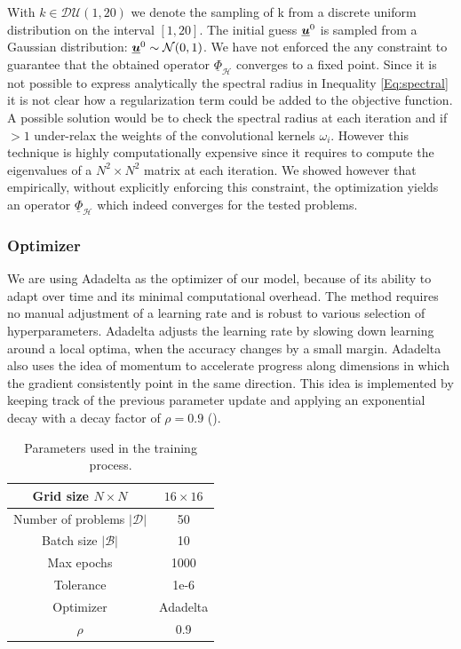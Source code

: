 \documentclass{rescience} %
\begin{document}
With $k \in \mathcal{DU}(1, 20)$ we denote the sampling of k from a discrete uniform distribution on the interval $[1, 20]$. The initial guess $\underline{{\bm{u}}}^0$ is sampled from a Gaussian distribution: $\underline{{\bm{u}}}^0 \sim \mathcal{N}(0, 1)$. We have not enforced the any constraint to guarantee that the obtained operator $\underline{\Phi}_{\mathcal{H}}$ converges to a fixed point. Since it is not possible to express analytically the spectral radius in Inequality \ref{Eq:spectral} it is not clear how a regularization term could be added to the objective function.
A possible solution would be to check the spectral radius at each iteration and if $>1$ under-relax the weights of the convolutional kernels $\omega_i$.
However this technique is highly computationally expensive since it requires to compute the eigenvalues of a $N^2\times N^2$ matrix at each iteration. 
We showed however that empirically, without explicitly enforcing this constraint, the optimization yields an operator $\underline{\Phi}_{\mathcal{H}}$ which indeed converges for the tested problems.



\subsubsection{Optimizer}
We are using Adadelta as the optimizer of our model, because of its ability to adapt over time and its minimal computational overhead. The method requires no manual adjustment of a learning rate and is robust to various selection of hyperparameters. Adadelta adjusts the learning rate by slowing down learning around a local optima, when the accuracy changes by a small margin. Adadelta also uses the idea of momentum to accelerate progress along dimensions in which the gradient consistently point in the same direction. This idea is implemented by keeping track of the previous parameter update and applying an exponential decay with a decay factor of $\rho = 0.9$ (\cite{adadelta_ref}). \\

\begin{table}[h]
\centering
\caption{Parameters used in the training process.}
\begin{tabular}{| c | c |}
	  \hline
      Grid size $N\times N$  & $16\times 16$ \\
      \hline
      Number of problems $|\mathcal{D}|$  & 50 \\
      \hline
      Batch size $|\mathcal{B}|$ & 10  \\
      \hline
      Max epochs & 1000 \\
      \hline
      Tolerance &  1e-6  \\
      \hline
      Optimizer  & Adadelta   \\
      \hline
      $\rho$ & 0.9  \\
      \hline
\end{tabular}
\label{table:parameters}
\end{table}
\end{document}
